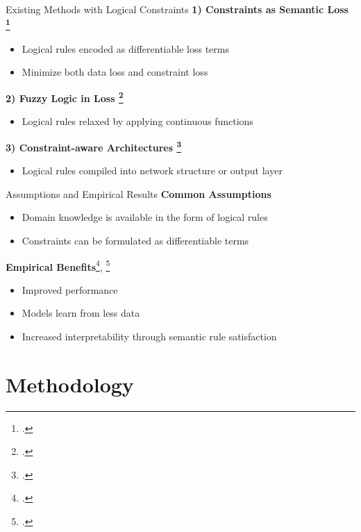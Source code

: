 \documentclass[aspectratio=169]{beamer}
\begin{document}
\begin{frame}{Existing Methods with Logical Constraints}
    \textbf{1) Constraints as Semantic Loss \footcite{xu2018semanticlossfunctiondeep}}
    \begin{itemize}
      \item Logical rules encoded as differentiable loss terms
      \item Minimize both data loss and constraint loss
    \end{itemize}

    \textbf{2) Fuzzy Logic in Loss \footcite{Badreddine_2022}}
    \begin{itemize}
      \item Logical rules relaxed by applying continuous functions
    \end{itemize}

    \textbf{3) Constraint-aware Architectures \footcite{yang2023injectinglogicalconstraintsneural}}
    \begin{itemize}
      \item Logical rules compiled into network structure or output layer
    \end{itemize}
\end{frame}

\begin{frame}{Assumptions and Empirical Results}
    \textbf{Common Assumptions}
    \begin{itemize}
      \item Domain knowledge is available in the form of logical rules
      \item Constraints can be formulated as differentiable terms
    \end{itemize}

    \textbf{Empirical Benefits}\footcite{Giunchiglia_2022}, \footcite{stoian2024realisticsyntheticdataconstraining}
    \begin{itemize}
      \item Improved performance
      \item Models learn from less data
      \item Increased interpretability through semantic rule satisfaction
    \end{itemize}
\end{frame}

\section{Methodology}
\end{document}
